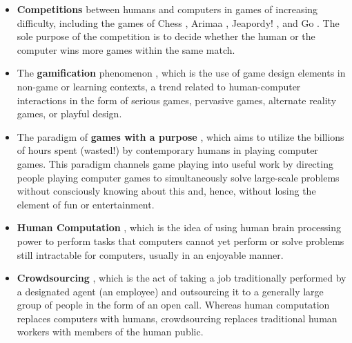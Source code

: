 \begin{itemize}
	\item 	\textbf{Competitions} between humans and computers in games of increasing difficulty, including the games of Chess \cite{hsu2002behind}, Arimaa \cite{syed2003arimaa}, Jeapordy! \cite{ferrucci2013watson}, and Go \cite{gelly2011monte}. The sole purpose of the competition is to decide whether the human or the computer wins more games within the same match.
	
	\item The \textbf{gamification} phenomenon \cite{seaborn2015gamification,dubbels2013gamification,boughzala2016introduction}, which is the use of game design elements in non-game or learning contexts, a trend related to human-computer interactions in the form of serious games, pervasive games, alternate reality games, or playful design.
	
	\item The paradigm of \textbf{games with a purpose} \cite{von2006games,von2008designing,siorpaes2008games,good2011games,jain2008game}, which aims to utilize the billions of hours spent (wasted!) by contemporary humans in playing computer games. This paradigm channels game playing into useful work by directing people playing computer games to simultaneously solve large-scale problems without consciously knowing about this and, hence, without losing the element of fun or entertainment. 
	
	\item \textbf{Human Computation} \cite{quinn2011human}, which is the idea of using human brain processing power to perform tasks that computers cannot yet perform or solve problems still intractable for computers, usually in an enjoyable manner.
	
	\item \textbf{Crowdsourcing} \cite{brabham2008crowdsourcing}, which is the act of taking a job traditionally performed by a designated agent (an employee) and outsourcing it to a generally large group of people in the form of an open call. Whereas human computation replaces computers with humans, crowdsourcing replaces traditional human workers with members of the human public.
\end{itemize}

